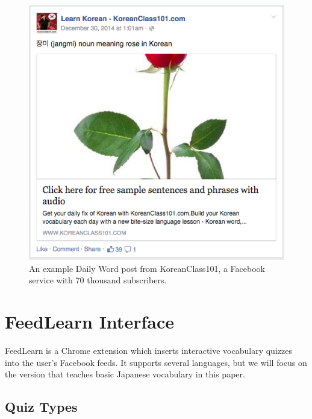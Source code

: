 \documentclass{chi-ext}
\begin{document}
\begin{figure}
\includegraphics[width=\columnwidth]{learn-korean-post.png}
\caption{An example Daily Word post from KoreanClass101, a Facebook service with 70 thousand subscribers.}
\label{fig:learn-korean}
\end{figure}



\section{FeedLearn Interface}

FeedLearn is a Chrome extension which inserts interactive vocabulary quizzes into the user's Facebook feeds. It supports several languages, but we will focus on the version that teaches basic Japanese vocabulary in this paper.

\subsection{Quiz Types}
\end{document}
